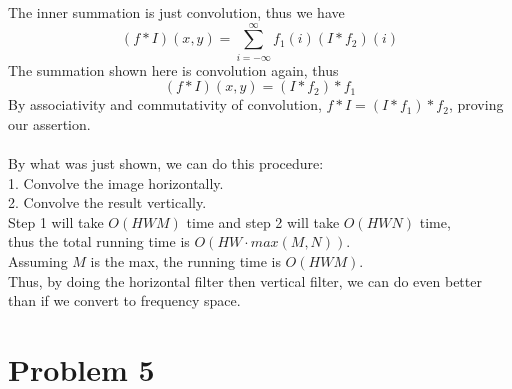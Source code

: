 \documentclass[11pt,psfig]{article}
\begin{document}
The inner summation is just convolution, thus we have
\[
(f*I)(x,y) = \sum_{i=-\infty}^{\infty} f_1(i) (I*f_2)(i)
\]
The summation shown here is convolution again, thus
\[
(f*I)(x,y) = (I*f_2)*f_1
\]
By associativity and commutativity of convolution, $f*I=(I*f_1)*f_2$, proving our assertion. \\
\\
By what was just shown, we can do this procedure:\\
1. Convolve the image horizontally. \\
2. Convolve the result vertically. \\
Step 1 will take $O(HWM)$ time and step 2 will take $O(HWN)$ time, \\
thus the total running time is $O(HW \cdot max(M,N))$. \\
Assuming $M$ is the max, the running time is $O(HWM)$.\\
Thus, by doing the horizontal filter then vertical filter, we can do even better than if we convert to frequency space. \\ 

\newpage

\section*{Problem 5}
\end{document}
